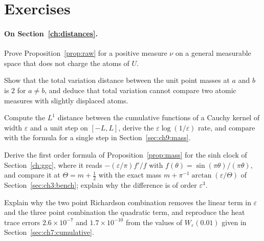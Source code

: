 \section{Exercises}\label{chap:measure:ex}

\paragraph{On Section~\ref{ch:distances}.}
\begin{exercises}
\item Prove Proposition~\ref{prop:raw} for a positive measure $\nu$ on a general measurable space that does not charge the atoms of $U$.
\item Show that the total variation distance between the unit point masses at $a$ and $b$ is $2$ for $a\ne b$, and deduce that total variation cannot compare two atomic measures with slightly displaced atoms.
\item Compute the $L^1$ distance between the cumulative functions of a Cauchy kernel of width $\varepsilon$ and a unit step on $[-L,L]$, derive the $\varepsilon\log(1/\varepsilon)$ rate, and compare with the formula for a single step in Section~\ref{sec:ch9:mass}.
\item Derive the first order formula of Proposition~\ref{prop:mass} for the sinh clock of Section~\ref{ch:ggc}, where it reads $-(\varepsilon/\pi)f'/f$ with $f(\theta)=\sin(\pi\theta)/(\pi\theta)$, and compare it at $\Theta=m+\frac12$ with the exact mass $m+\pi^{-1}\arctan(\varepsilon/\Theta)$ of Section~\ref{sec:ch3:bench}; explain why the difference is of order $\varepsilon^3$.
\item Explain why the two point Richardson combination removes the linear term in $\varepsilon$ and the three point combination the quadratic term, and reproduce the heat trace errors $2.6\times10^{-7}$ and $1.7\times10^{-10}$ from the values of $W_\varepsilon(0.01)$ given in Section~\ref{sec:ch7:cumulative}.
\end{exercises}

